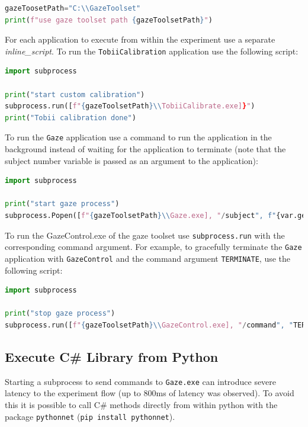 \documentclass[a4paper,oneside]{book}
\begin{document}
\begin{lstlisting}[language=Python]
gazeToosetPath="C:\\GazeToolset"
print(f"use gaze toolset path {gazeToolsetPath}")
\end{lstlisting}

For each application to execute from within the experiment use a separate \emph{inline\_script}.
To run the \texttt{TobiiCalibration} application use the following script:

\begin{lstlisting}[language=Python]
import subprocess

print("start custom calibration")
subprocess.run([f"{gazeToolsetPath}\\TobiiCalibrate.exe]}")
print("Tobii calibration done")
\end{lstlisting}

To run the \texttt{Gaze} application use a command to run the application in the background instead of waiting for the application to terminate (note that the subject number variable is passed as an argument to the application):

\begin{lstlisting}[language=Python]
import subprocess

print("start gaze process")
subprocess.Popen([f"{gazeToolsetPath}\\Gaze.exe], "/subject", f"{var.get(u'subject_nr')}")
\end{lstlisting}

To run the GazeControl.exe of the gaze toolset use \texttt{subprocess.run} with the corresponding command argument.
For example, to gracefully terminate the \texttt{Gaze} application with \texttt{GazeControl} and the command argument \texttt{TERMINATE}, use the following script:

\begin{lstlisting}[language=Python]
import subprocess

print("stop gaze process")
subprocess.run([f"{gazeToolsetPath}\\GazeControl.exe], "/command", "TERMINATE")
\end{lstlisting}

\subsection{Execute C\# Library from Python}
Starting a subprocess to send commands to \texttt{Gaze.exe} can introduce severe latency to the experiment flow (up to 800ms of latency was observed).
To avoid this it is possible to call C\# methods directly from within python with the package \texttt{pythonnet} (\texttt{pip install pythonnet}).
\end{document}
